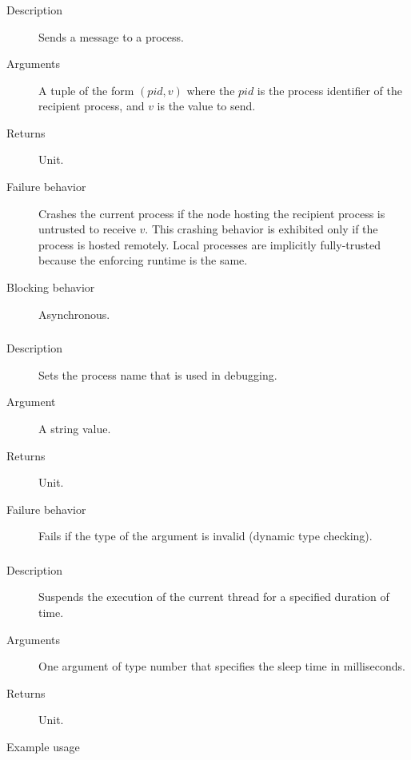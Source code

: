 \subsubsection{}
\begin{description}
    \item [Description] Sends a message to a process.
    \item [Arguments] A tuple of the form $(\mathit{pid}, v)$ where the $\mathit{pid}$ is the process identifier
of the recipient process, and $v$ is the value to send.
    \item [Returns] Unit.
    \item [Failure behavior] Crashes the current process if the node hosting the recipient process is untrusted to receive $v$.
This crashing behavior is exhibited only if the process is hosted remotely. Local processes are implicitly fully-trusted because the
enforcing runtime is the same.
    \item [Blocking behavior] Asynchronous.
\end{description}


\subsubsection{}
\begin{description}
    \item [Description] Sets the process name that is used in debugging.
    \item [Argument] A string value.
    \item [Returns] Unit.
    \item [Failure behavior] Fails if the type of the argument is invalid (dynamic type checking).
\end{description}


\subsubsection{}
\begin{description}
    \item [Description] Suspends the execution of the current thread for a specified duration of time.
    \item [Arguments] One argument of type number that specifies the sleep time in milliseconds.
    \item [Returns] Unit.
    \item [Example usage] 
\end{description}


